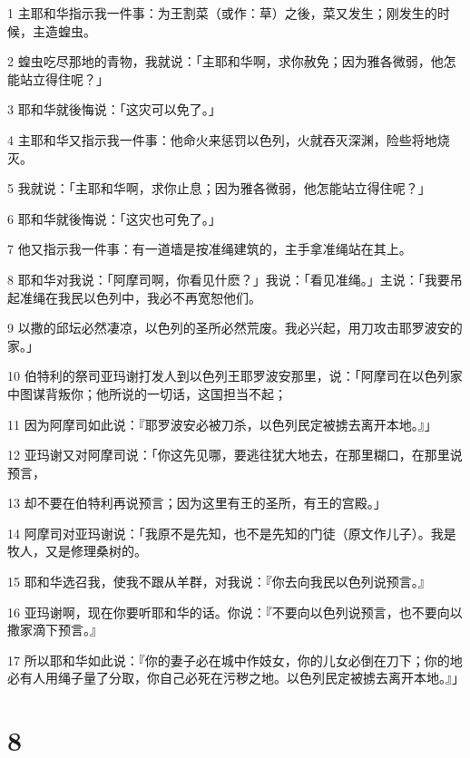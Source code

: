 \par 1 主耶和华指示我一件事：为王割菜（或作：草）之後，菜又发生；刚发生的时候，主造蝗虫。
\par 2 蝗虫吃尽那地的青物，我就说：「主耶和华啊，求你赦免；因为雅各微弱，他怎能站立得住呢？」
\par 3 耶和华就後悔说：「这灾可以免了。」
\par 4 主耶和华又指示我一件事：他命火来惩罚以色列，火就吞灭深渊，险些将地烧灭。
\par 5 我就说：「主耶和华啊，求你止息；因为雅各微弱，他怎能站立得住呢？」
\par 6 耶和华就後悔说：「这灾也可免了。」
\par 7 他又指示我一件事：有一道墙是按准绳建筑的，主手拿准绳站在其上。
\par 8 耶和华对我说：「阿摩司啊，你看见什麽？」我说：「看见准绳。」主说：「我要吊起准绳在我民以色列中，我必不再宽恕他们。
\par 9 以撒的邱坛必然凄凉，以色列的圣所必然荒废。我必兴起，用刀攻击耶罗波安的家。」
\par 10 伯特利的祭司亚玛谢打发人到以色列王耶罗波安那里，说：「阿摩司在以色列家中图谋背叛你；他所说的一切话，这国担当不起；
\par 11 因为阿摩司如此说：『耶罗波安必被刀杀，以色列民定被掳去离开本地。』」
\par 12 亚玛谢又对阿摩司说：「你这先见哪，要逃往犹大地去，在那里糊口，在那里说预言，
\par 13 却不要在伯特利再说预言；因为这里有王的圣所，有王的宫殿。」
\par 14 阿摩司对亚玛谢说：「我原不是先知，也不是先知的门徒（原文作儿子）。我是牧人，又是修理桑树的。
\par 15 耶和华选召我，使我不跟从羊群，对我说：『你去向我民以色列说预言。』
\par 16 亚玛谢啊，现在你要听耶和华的话。你说：『不要向以色列说预言，也不要向以撒家滴下预言。』
\par 17 所以耶和华如此说：『你的妻子必在城中作妓女，你的儿女必倒在刀下；你的地必有人用绳子量了分取，你自己必死在污秽之地。以色列民定被掳去离开本地。』」

\chapter{8}

